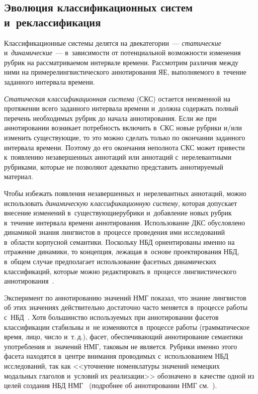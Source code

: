 \begin{multicols}{2}
\vspace*{-6pt}

\section{Эволюция классификационных систем 
и~реклассификация}

\vspace*{-2pt}

 Классификационные системы делятся на две\linebreak категории~--- 
\textit{статические} и~\textit{динамические}~--- в~зависимости от 
потенциальной возможности изменения рубрик на рассматриваемом интервале 
времени. Рассмотрим различия между ними на примере\linebreak лингвистического 
аннотирования ЯЕ, выполня\-емого в~течение заданного 
интервала времени.
     
     \textit{Статическая классификационная система} (СКС) остается 
неизменной на протяжении всего заданного интервала времени и~должна 
содержать полный перечень необходимых рубрик до начала аннотирования. 
Если же при аннотировании возникает потребность включить в~СКС новые 
рубрики и/или изменить существующие, то это можно сделать только по 
окончании заданного интервала времени. Поэтому до его окончания неполнота 
СКС может привести к~появлению незавершенных аннотаций или аннотаций 
с~нерелевантными рубриками, которые не позволяют адекватно представить 
аннотируемый материал.
     
     Чтобы избежать появления незавершенных и~нерелевантных аннотаций, 
можно использовать \textit{динамическую классификационную систему}, 
которая допускает внесение изменений в~существующие\linebreak руб\-ри\-ки 
и~добавление новых рубрик в~течение интервала времени аннотирования. 
Использование ДКС обусловлено динамикой знания лингвистов в~процессе 
проведения ими исследований в~об\-ласти корпусной семантики. Поскольку 
НБД ориентированы именно на отражение динамики, то концепция, лежащая 
в~основе проектирования НБД, в~общем случае предполагает использование 
фасетных динамических классификаций, которые можно редактировать 
в~процессе лингвистического аннотирования~\cite{8-gon, 9-gon}.
      
     Эксперимент по аннотированию значений НМГ показал, что знание 
лингвистов об этих значениях действительно достаточно часто меняется 
в~процессе работы с~НБД~\cite{14-gon}. Хотя большинство используемых при 
аннотировании фасетов классификации стабильны и~не изменяются 
в~процессе работы (грамматическое время, лицо, число и~т.\,д.), фасет, 
обеспечивающий аннотирование семантики употребления и~значений НМГ, 
таковым не является. Рубрики именно этого фасета находятся в~центре 
внимания проводимых с~использованием НБД исследований, так как 
<<уточнение номенклатуры значений немецких модальных глаголов и~условий 
их реализации>> обозначено в~качестве одной из целей создания НБД 
НМГ~\cite[с.~173]{15-gon} (подробнее об аннотировании НМГ 
см.~\cite[с.~175--181]{15-gon}).
     

\end{multicols}
